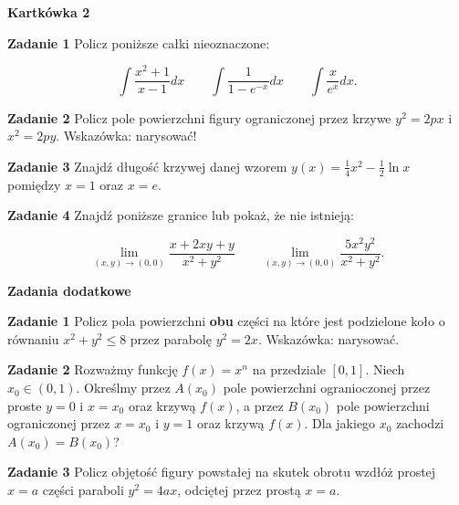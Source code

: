 \documentclass[a4paper,11pt]{article}
\begin{document}
\begin{center}
  {\large\textbf{Kartkówka 2}}
\end{center}

\hrulefill

\bigskip

\textbf{Zadanie 1} Policz poniższe całki nieoznaczone:

\[
\int \frac{x^2+1}{x-1} dx 
\quad \quad 
\int \frac{1}{1-e^{-x}} dx
\quad \quad
\int \frac{x}{e^x}  dx
.\] 

\bigskip

\textbf{Zadanie 2} Policz pole powierzchni figury ograniczonej przez
krzywe $y^2=2px$ i  $x^2 = 2py$. Wskazówka: narysować!

\bigskip

\textbf{Zadanie 3} Znajdź długość krzywej danej wzorem $y(x) =
\frac{1}{4} x^2 - \frac{1}{2} \ln x$ pomiędzy $x = 1$ oraz $x=e$.

\bigskip

\textbf{Zadanie 4} Znajdź poniższe granice lub pokaż, że nie istnieją:

\[
\lim_{(x,y)\to (0,0)} \frac{x + 2xy + y}{x^2 + y^2}
\quad \quad
\lim_{(x,y) \to (0,0)} \frac{5x^2y^2}{x^2 + y^2}
.\] 

\hrulefill

\begin{center}
    \textbf{Zadania dodatkowe}
\end{center}

\textbf{Zadanie 1} Policz pola powierzchni \textbf{obu} części na które
jest podzielone koło o równaniu {$x^2 + y^2 \le 8$} przez parabolę  $y^2 =
2x$. Wskazówka: narysować.

\bigskip

\textbf{Zadanie 2} Rozważmy funkcję $f(x) = x^n$ na przedziale  $[0,1]$.
Niech  $x_0 \in (0,1)$. Określmy  przez  $A(x_0)$ pole powierzchni
ogranioczonej przez proste $y=0$ i  $x=x_0$ oraz krzywą $f(x)$, a przez
$B(x_0)$  pole powierzchni ograniczonej przez $x=x_0$ i $y=1$ oraz krzywą
 $f(x)$. Dla jakiego  $x_0$ zachodzi  $A(x_0) = B(x_0)$?

 \bigskip

 \textbf{Zadanie 3} Policz objętość figury powstałej na skutek obrotu
 wzdłóż prostej $x=a$ części paraboli  $y^2=4ax$, odciętej przez prostą
  $x=a$.
\end{document}

